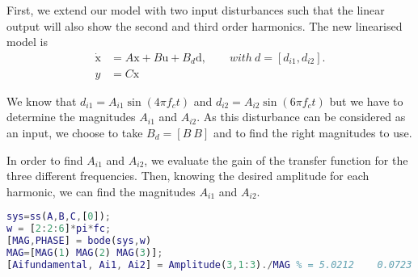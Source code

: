 First, we extend our model with two input disturbances such that the linear output will also show the second and third order harmonics. The new linearised model is
\begin{align*}
   \dot{\text{x}} &= A\text{x} + B\text{u} +B_d\text{d}, \qquad with\ d = [d_{i1}, d_{i2}].\\
   y &= C\text{x}
\end{align*}



We know that $d_{i1} = A_{i1}\sin(4\pi f_ct)$ and $d_{i2} = A_{i2}\sin(6\pi f_ct)$ but we have to determine the magnitudes $A_{i1}$ and $A_{i2}$. As this disturbance can be considered as an input, we choose to take $B_d = [B\ B]$ and to find the right magnitudes to use.

In order to find $A_{i1}$ and $A_{i2}$, we evaluate the gain of the transfer function for the three different frequencies. Then, knowing the desired amplitude for each harmonic, we can find the magnitudes $A_{i1}$ and $A_{i2}$.

\begin{lstlisting}[language=Matlab]
sys=ss(A,B,C,[0]);
w = [2:2:6]*pi*fc;
[MAG,PHASE] = bode(sys,w)
MAG=[MAG(1) MAG(2) MAG(3)];
[Aifundamental, Ai1, Ai2] = Amplitude(3,1:3)./MAG % = 5.0212    0.0723    0.0792
\end{lstlisting}